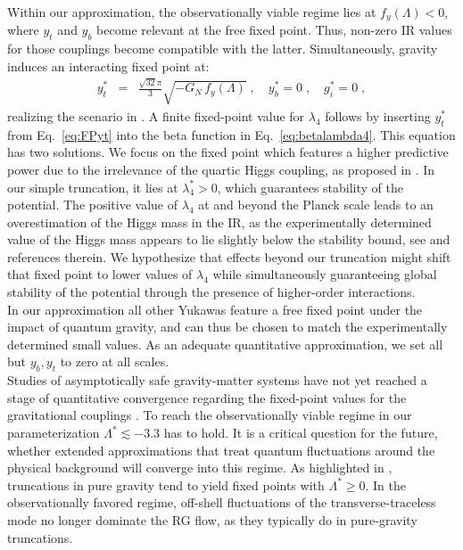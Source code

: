 \documentclass[%
 reprint,
 superscriptaddress,
preprintnumbers,
nofootinbib,
 amsmath,amssymb,
 aps,
prl,
]{revtex4-1}
\newcommand{\bea}{\begin{eqnarray}}
\newcommand{\eea}{\end{eqnarray}}
\begin{document}
Within our approximation, the observationally viable regime lies at $f_y(\Lambda)<0$, where $y_t$ and $y_b$ become relevant at the free fixed point. Thus, non-zero IR values for those couplings become compatible with the latter.
Simultaneously, gravity induces an interacting fixed point at:
\bea
y_{t}^{\ast} &=&
\frac{\sqrt{32}\pi}{3}\sqrt{ -G_N\,f_y(\Lambda)} 
\;, \quad 
y_{b}^{\ast}= 0\;,  \quad 
g_{i}^{\ast} = 0\; \label{eq:FPyt},
\eea
realizing the scenario in \cite{Eichhorn:2017eht}. A finite fixed-point value for $\lambda_{4}$ follows  
by inserting $y_t^{\ast}$ from Eq.~\eqref{eq:FPyt} into the beta function in Eq.~\eqref{eq:betalambda4}.  This
equation has two solutions. We focus on the fixed point which features a higher predictive power due to the  irrelevance of the  quartic Higgs coupling, as proposed in \cite{Shaposhnikov:2009pv,Bezrukov:2012sa}. In our simple truncation, it lies at $\lambda_4^{\ast}>0$, which guarantees stability of the potential. The positive value of $\lambda_4$ at and beyond the Planck scale leads to an overestimation of the Higgs mass in the IR, as the experimentally determined value of the Higgs mass appears to lie slightly below the stability bound, see \cite{Bezrukov:2012sa,Degrassi:2012ry,Buttazzo:2013uya} and references therein. 
We hypothesize that effects beyond our truncation might shift that fixed point to
lower values of $\lambda_4$ while simultaneously guaranteeing global stability of the potential through the presence of higher-order interactions.\\
In our approximation all other Yukawas feature a free fixed point under the impact of quantum gravity, and can thus be chosen to match the experimentally determined small values.
As an adequate quantitative approximation, we set all but $y_b, y_t$ to zero at all scales.
\\
Studies of asymptotically safe gravity-matter systems have not yet reached a stage of quantitative convergence regarding the fixed-point values for the gravitational couplings  \cite{Dona:2013qba,Meibohm:2015twa,Dona:2015tnf,Eichhorn:2016vvy,Biemans:2017zca}. To reach the observationally viable regime in our parameterization $\Lambda^{\ast}\lesssim-3.3$ has to hold.  It is a critical question for the future, whether extended approximations that treat quantum fluctuations around the physical background will converge into this regime.
As highlighted in \cite{Eichhorn:2017eht}, truncations in pure gravity tend to yield fixed points  with
$\Lambda^{\ast} \geq 0$. In the observationally favored regime, off-shell fluctuations of the transverse-traceless mode no longer dominate the RG flow, as they typically do in pure-gravity truncations.
\end{document}
